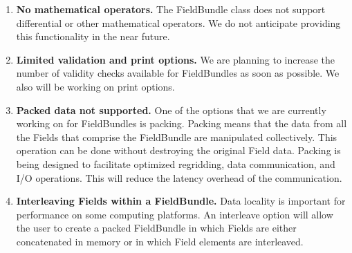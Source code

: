 
\label{sec:bundlerest}

\begin{enumerate}
\item{\bf No mathematical operators.}
The FieldBundle class does not support differential or other
mathematical operators.  We do not anticipate providing this 
functionality in the near future.

\item{\bf Limited validation and print options.}
We are planning to increase the number of validity checks available
for FieldBundles as soon as possible.  We also will
be working on print options.

\item{\bf Packed data not supported.}
One of the options that we are currently working on for FieldBundles is
packing.  Packing means that the data from all the
Fields that comprise the FieldBundle are manipulated collectively.
This operation can be done without 
destroying the original Field data.  Packing is being designed to 
facilitate optimized regridding, data communication, and I/O operations.
This will reduce the latency overhead of the communication.  

\item{\bf Interleaving Fields within a FieldBundle.}
Data locality is important for performance on some computing
platforms.  An interleave option will allow the user to create
a packed FieldBundle in which Fields are either concatenated in memory
or in which Field elements are interleaved.

\end{enumerate}




